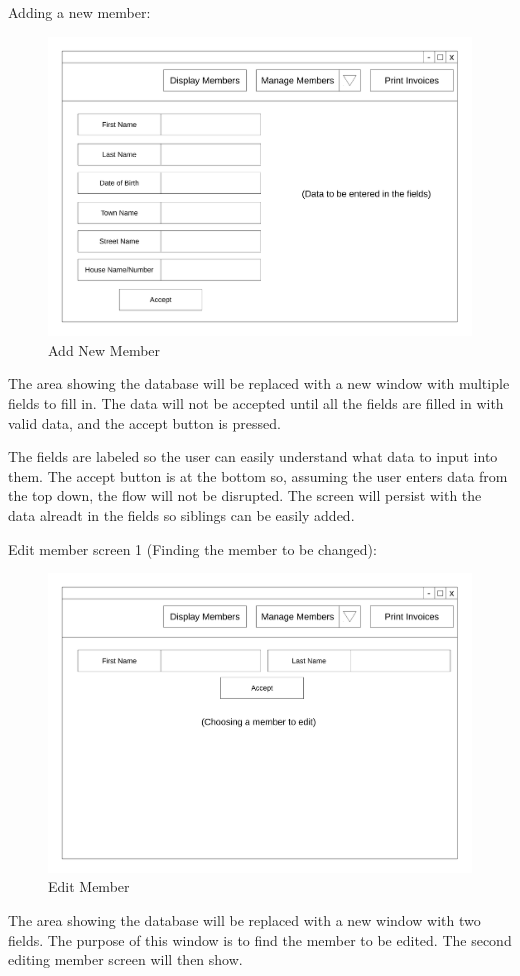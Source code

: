 Adding a new member:
\begin{figure}[H]
\includegraphics[width=\textwidth]{./Design/images/Add_New_Member.pdf}
    \caption{Add New Member} \label{fig:Interface Design}
\end{figure}
The area showing the database will be replaced with a new window with multiple fields to fill in. The data will not be accepted until all the fields are filled in with valid data, and the accept button is pressed.

The fields are labeled so the user can easily understand what data to input into them. The accept button is at the bottom so, assuming the user enters data from the top down, the flow will not be disrupted. The screen will persist with the data alreadt in the fields so siblings can be easily added.

Edit member screen 1 (Finding the member to be changed):
\begin{figure}[H]
\includegraphics[width=\textwidth]{./Design/images/Edit_Member_1.pdf}
    \caption{Edit Member} \label{fig:Interface Design}
\end{figure}
The area showing the database will be replaced with a new window with two fields. The purpose of this window is to find the member to be edited. The second editing member screen will then show.

